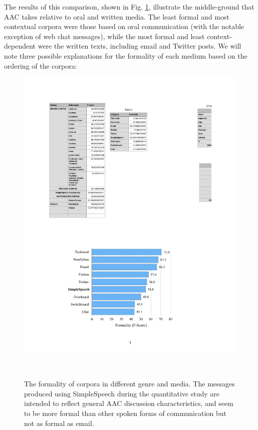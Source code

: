 The results of this comparison, shown in Fig. \ref{fig:formality}, illustrate the middle-ground that AAC takes relative to oral and written media. 
The least formal and most contextual corpora were those based on oral communication (with the notable exception of web chat messages), while the most formal and least context-dependent were the written texts, including email and Twitter posts. 
We will note three possible explanations for the formality of each medium based on the ordering of the corpora:

\begin{figure}
	\centering
	\includegraphics[width=\columnwidth,keepaspectratio]{figures/formality_comparison}
	\caption{The formality of corpora in different genre and media. The messages produced using SimpleSpeech during the quantitative study are intended to reflect general AAC discussion characteristics, and seem to be more formal than other spoken forms of communication but not as formal as email.}~\label{fig:formality}
\end{figure}

